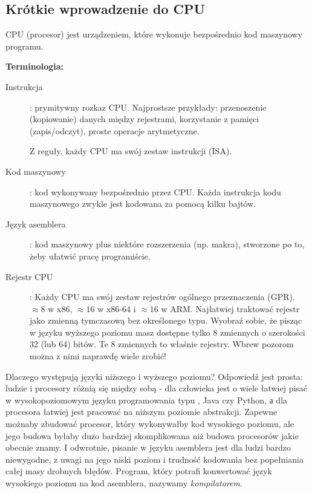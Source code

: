 \subsection{Krótkie wprowadzenie do CPU}

\ac{CPU} (procesor) jest urządzeniem, które wykonuje bezpośrednio kod maszynowy programu.

\textbf{Terminologia:}

\begin{description}
\item[Instrukcja]: prymitywny rozkaz \ac{CPU}.
Najprostsze przykłady: przenoszenie (kopiowanie) danych między rejestrami, korzystanie z pamięci (zapis/odczyt), proste operacje arytmetyczne.

Z reguły, każdy \ac{CPU} ma swój zestaw instrukcji (\ac{ISA}).

\item[Kod maszynowy]: kod wykonywany bezpośrednio przez \ac{CPU}. 
Każda instrukcja kodu maszynowego zwykle jest kodowana za pomocą kilku bajtów.
\item[Język asemblera]: kod maszynowy plus niektóre rozszerzenia (np. makra), stworzone po to, żeby ułatwić pracę programiście.
\item[Rejestr CPU]: Każdy \ac{CPU} ma swój zestaw rejestrów ogólnego przeznaczenia (\ac{GPR}).
$\approx 8$ w x86, $\approx 16$ w x86-64 i $\approx 16$ w ARM.
Najłatwiej traktować rejestr jako zmienną tymczasową bez określonego typu.
Wyobraź sobie, że pisząc w języku wyższego poziomu masz dostępne tylko 8 zmiennych o szerokości 32 (lub 64) bitów.
Te 8 zmiennych to właśnie rejestry. Wbrew pozorom można z nimi naprawdę wiele zrobić!
\end{description}

Dlaczego występują języki niższego i wyższego poziomu? Odpowiedź jest prosta: ludzie i procesory różnią się między sobą - dla człowieka jest o wiele łatwiej pisać w wysokopoziomowym języku programowania typu \CCpp, Java czy Python, а dla procesora łatwiej jest pracować na niższym poziomie abstrakcji.
Zapewne możnaby zbudować procesor, który wykonywałby kod wysokiego poziomu, ale jego budowa byłaby dużo bardziej skomplikowana niż  budowa procesorów jakie obecnie znamy.
I odwrotnie, pisanie w języku asemblera jest dla ludzi bardzo niewygodne, z uwagi na jego niski poziom i trudność kodowania bez popełniania całej masy drobnych błędów.
Program, który potrafi konwertować język wysokiego poziomu na kod asemblera, nazywamy \emph{kompilatorem}.

%
%
%

